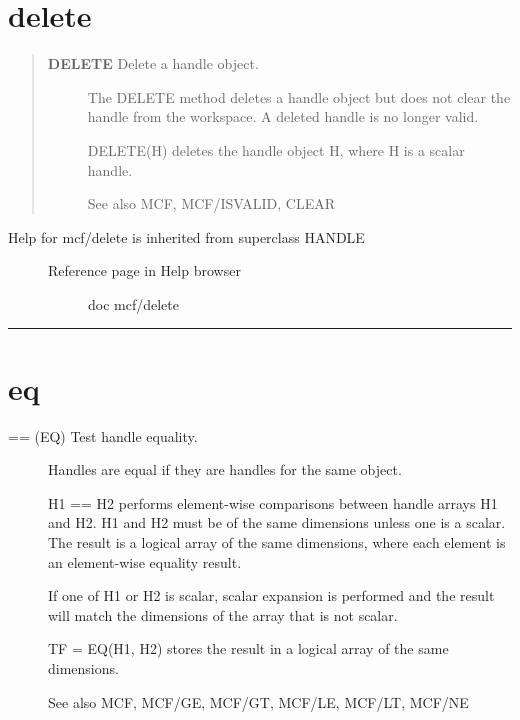 \documentclass[letterpaper,10pt,english]{sphinxmanual}
\begin{document}
\section{delete}
\label{classes/utils/@mcf/mcf:id5}\label{classes/utils/@mcf/mcf:delete}\begin{quote}
\begin{description}
\item[{\textbf{DELETE}   Delete a handle object.}] \leavevmode
The DELETE method deletes a handle object but does not clear the handle
from the workspace.  A deleted handle is no longer valid.

DELETE(H) deletes the handle object H, where H is a scalar handle.

See also MCF, MCF/ISVALID, CLEAR

\end{description}
\end{quote}
\begin{description}
\item[{Help for mcf/delete is inherited from superclass HANDLE}] \leavevmode\begin{description}
\item[{Reference page in Help browser}] \leavevmode
doc mcf/delete

\end{description}

\end{description}


\bigskip\hrule{}\bigskip



\section{eq}
\label{classes/utils/@mcf/mcf:id6}\label{classes/utils/@mcf/mcf:eq}\begin{description}
\item[{== (EQ)   Test handle equality.}] \leavevmode
Handles are equal if they are handles for the same object.

H1 == H2 performs element-wise comparisons between handle arrays H1 and
H2.  H1 and H2 must be of the same dimensions unless one is a scalar.
The result is a logical array of the same dimensions, where each
element is an element-wise equality result.

If one of H1 or H2 is scalar, scalar expansion is performed and the
result will match the dimensions of the array that is not scalar.

TF = EQ(H1, H2) stores the result in a logical array of the same
dimensions.

See also MCF, MCF/GE, MCF/GT, MCF/LE, MCF/LT, MCF/NE

\end{description}
\end{document}
